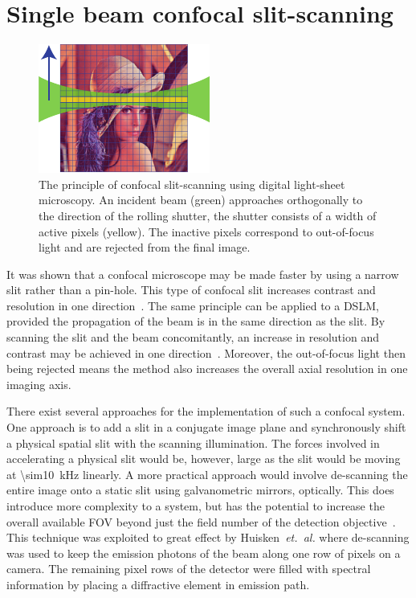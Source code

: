 \pagebreak

\section{Single beam confocal \gls{slit-scanning}}

\begin{figure}
  \centering
  \includegraphics[width=0.4\linewidth]{slit_scanning_alt}
  \caption[The principle of confocal \gls{slit-scanning} using digital light-sheet microscopy]{The principle of confocal \gls{slit-scanning} using digital light-sheet microscopy.
  An incident beam (green) approaches orthogonally to the direction of the rolling shutter, the shutter consists of a width of active pixels (yellow).
  The inactive pixels correspond to out-of-focus light and are rejected from the final image.}\label{fig:slit_scanning_alt}
\end{figure}

It was shown that a confocal microscope may be made faster by using a narrow slit rather than a pin-hole.
This type of confocal slit increases contrast and resolution in one direction~\cite{sabharwalSlitscanningConfocalMicroendoscope1999}.
The same principle can be applied to a \gls{DSLM}, provided the propagation of the beam is in the same direction as the slit.
By scanning the slit and the beam concomitantly, an increase in resolution and contrast may be achieved in one direction~\cite{baumgartScannedLightSheet2012}.
Moreover, the out-of-focus light then being rejected means the method also increases the overall axial resolution in one imaging axis.

There exist several approaches for the implementation of such a confocal system.
One approach is to add a slit in a conjugate image plane and synchronously shift a physical spatial slit with the scanning illumination.
The forces involved in accelerating a physical slit would be, however, large as the slit would be moving at \SI{\sim10}{\kilo\hertz} linearly.
A more practical approach would involve de-scanning the entire image onto a static slit using galvanometric mirrors, optically.
This does introduce more complexity to a system, but has the potential to increase the overall available \gls{FOV} beyond just the field number of the detection objective~\cite{jahrHyperspectralLightSheet2015}.
This technique was exploited to great effect by Huisken~\emph{et.~al.} where de-scanning was used to keep the emission photons of the beam along one row of pixels on a camera.
The remaining pixel rows of the detector were filled with spectral information by placing a diffractive element in emission path.

